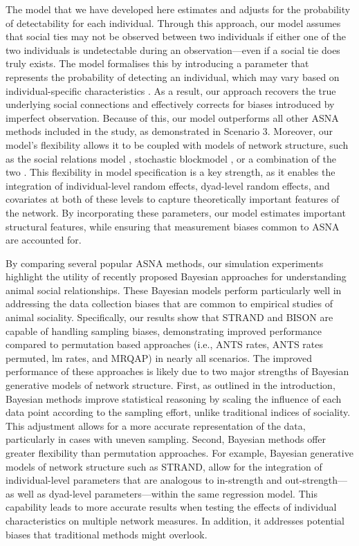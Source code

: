 \documentclass[Afour,sageh,times]{sagej}
\begin{document}
The model that we have developed here estimates and adjusts for the probability of detectability for each individual. Through this approach, our model assumes that social ties may not be observed between two individuals if either one of the two individuals is undetectable during an observation---even if a social tie does truly exists. The model formalises this by introducing a parameter that represents the probability of detecting an individual, which may vary based on individual-specific characteristics \citep[e.g., more cryptic colors in females birds:][]{Farine2015a}. As a result, our approach recovers the true underlying social connections and effectively corrects for biases introduced by imperfect observation. Because of this, our model outperforms all other ASNA methods included in the study, as demonstrated in Scenario 3. Moreover, our model's flexibility allows it to be coupled with models of network structure, such as the social relations model \citep{kenny1984social}, stochastic blockmodel \citep{holland1983stochastic}, or a combination of the two \citep{redhead2023reliable}. This flexibility in model specification is a key strength, as it enables the integration of individual-level random effects, dyad-level random effects, and covariates at both of these levels to capture theoretically important features of the network. By incorporating these parameters, our model estimates important structural features, while ensuring that measurement biases common to ASNA are accounted for.

By comparing several popular ASNA methods, our simulation experiments highlight the utility of recently proposed Bayesian approaches for understanding animal social relationships. These Bayesian models perform particularly well in addressing the data collection biases that are common to empirical studies of animal sociality. Specifically, our results show that STRAND and BISON are capable of handling sampling biases, demonstrating improved performance compared to permutation based approaches (i.e., ANTS rates, ANTS rates permuted, lm rates, and MRQAP) in nearly all scenarios. The improved performance of these approaches is likely due to two major strengths of Bayesian generative models of network structure. First, as outlined in the introduction, Bayesian methods improve statistical reasoning by scaling the influence of each data point according to the sampling effort, unlike traditional indices of sociality. This adjustment allows for a more accurate representation of the data, particularly in cases with uneven sampling. Second, Bayesian methods offer greater flexibility than permutation approaches. For example, Bayesian generative models of network structure such as STRAND, allow for the integration of individual-level parameters that are analogous to in-strength and out-strength---as well as dyad-level parameters---within the same regression model. This capability leads to more accurate results when testing the effects of individual characteristics on multiple network measures. In addition, it addresses potential biases that traditional methods might overlook. 
\end{document}
